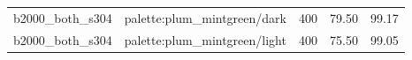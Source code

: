 \begin{longtable}{l>{\raggedright\arraybackslash}p{.42\linewidth}rrr}
b2000\_\allowbreak{}both\_\allowbreak{}s304 & %
palette:plum\_\allowbreak{}mintgreen/dark & %
400 & %
79.50 & %
99.17 \\ %

b2000\_\allowbreak{}both\_\allowbreak{}s304 & %
palette:plum\_\allowbreak{}mintgreen/light & %
400 & %
75.50 & %
99.05 \\ %


\end{longtable}
